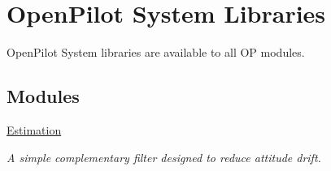 \hypertarget{group___open_pilot_libraries}{\section{Open\-Pilot System Libraries}
\label{group___open_pilot_libraries}
}


Open\-Pilot System libraries are available to all O\-P modules.  


\subsection*{Modules}
\begin{DoxyCompactItemize}
\item 
\hyperlink{group___attitude}{Estimation}
\begin{DoxyCompactList}\small\item\em A simple complementary filter designed to reduce attitude drift. \end{DoxyCompactList}\end{DoxyCompactItemize}
